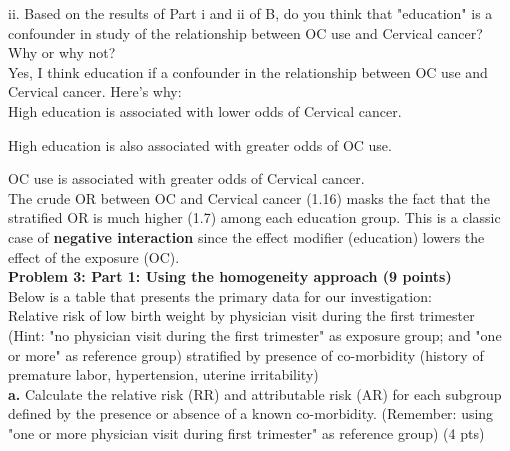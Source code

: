\documentclass[12pt]{article}
\begin{document}
ii. Based on the results of Part i and ii of B, do you think that "education" is a confounder in study of the relationship between OC use and Cervical cancer?  Why or why not? \\

Yes, I think education if a confounder in the relationship between OC use and Cervical cancer.  Here's why: \\

High education is associated with lower odds of Cervical cancer.

High education is also associated with greater odds of OC use.

OC use is associated with greater odds of Cervical cancer. \\

The crude OR between OC and Cervical cancer (1.16) masks the fact that the stratified OR is much higher (1.7) among each education group.  This is a classic case of \textbf{negative interaction} since the effect modifier (education) lowers the effect of the exposure (OC).  \\

\noindent \textbf{Problem 3: Part 1: Using the homogeneity approach (9 points)} \\

Below is a table that presents the primary data for our investigation: \\

Relative risk of low birth weight by physician visit during the first trimester (Hint: "no physician visit during the first trimester" as exposure group; and "one or more" as reference group) stratified by presence of co-morbidity (history of premature labor, hypertension, uterine irritability) \\


\noindent \textbf{a.} Calculate the relative risk (RR) and attributable risk (AR) for each subgroup defined by the presence or absence of a known co-morbidity.  (Remember: using "one or more physician visit during first trimester" as reference group) (4 pts) \\

\newpage
\end{document}
